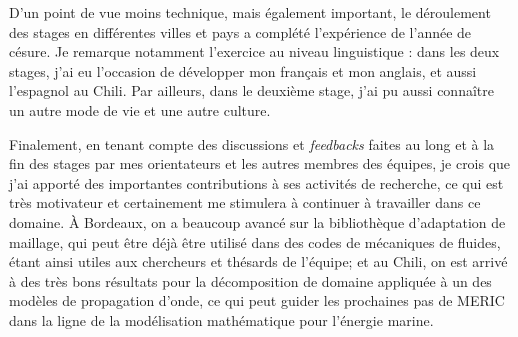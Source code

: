 \indent D'un point de vue moins technique, mais également important, le déroulement des stages en différentes villes et pays a complété l'expérience de l'année de césure. Je remarque notamment l'exercice au niveau linguistique : dans les deux stages, j'ai eu l'occasion de développer mon français et mon anglais, et aussi l'espagnol au Chili. Par ailleurs, dans le deuxième stage, j'ai pu aussi connaître un autre mode de vie et une autre culture.

\indent Finalement, en tenant compte des discussions et \emph{feedbacks} faites au long et à la fin des stages par mes orientateurs et les autres membres des équipes, je crois que j'ai apporté des importantes contributions à ses activités de recherche, ce qui est très motivateur et certainement me stimulera à continuer à travailler dans ce domaine. À Bordeaux, on a beaucoup avancé sur la bibliothèque d'adaptation de maillage, qui peut être déjà être utilisé dans des codes de mécaniques de fluides, étant ainsi utiles aux chercheurs et thésards de l'équipe; et au Chili, on est arrivé à des très bons résultats pour la décomposition de domaine appliquée à un des modèles de propagation  d'onde, ce qui peut guider les prochaines pas de MERIC dans la ligne de la modélisation mathématique pour l'énergie marine.